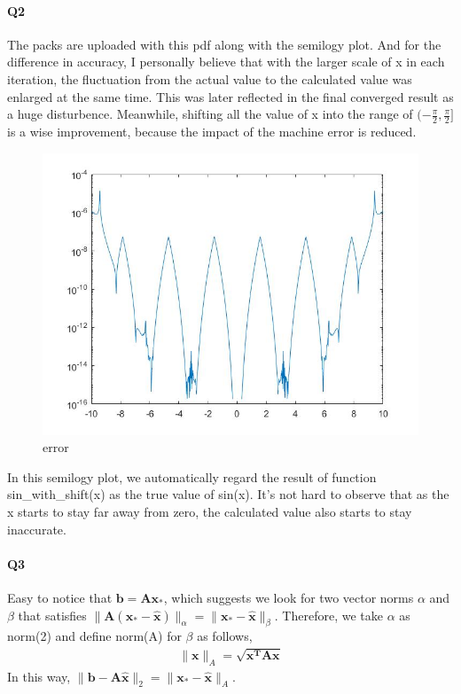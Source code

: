 \documentclass[11pt]{article}
\begin{document}
\paragraph{Q2}
The packs are uploaded with this pdf along with the semilogy plot. And for the difference in accuracy, I personally believe that with the larger scale of x in each iteration, the fluctuation from the actual value to the calculated value was enlarged at the same time. This was later reflected in the final converged result as a huge disturbence. Meanwhile, shifting all the value of x into the range of $(-\frac{\pi}{2}, \frac{\pi}{2}]$ is a wise improvement, because the impact of the  machine error is reduced.
\begin{figure}[H]
	\includegraphics[width=0.6\linewidth]{H1Q2.jpg}
	\centering
	\caption{error}
\end{figure}
In this semilogy plot, we automatically regard the result of function sin\_with\_shift(x) as the true value of sin(x). It's not hard to observe that as the x starts to stay far away from zero, the calculated value also starts to stay inaccurate.
\paragraph{Q3}
Easy to notice that $\mathbf{b}=\mathbf{A}\mathbf{x_*}$, which suggests we look for two vector norms $\alpha$ and $\beta$ that satisfies $\|\mathbf{A}(\mathbf{x_*}-\mathbf{\hat{x}})\|_\alpha =  \|\mathbf{x_*}-\mathbf{\hat{x}}\|_\beta$. Therefore, we take $\alpha$ as norm(2) and define norm(A) for $\beta$ as follows,
\begin{align}
	\|\mathbf{x}\|_A = \sqrt{\mathbf{x^TAx}}
\end{align}
In this way, $\|\mathbf{b}-\mathbf{A\hat{x}}\|_2 =  \|\mathbf{x_*}-\mathbf{\hat{x}}\|_A$.
\end{document}
